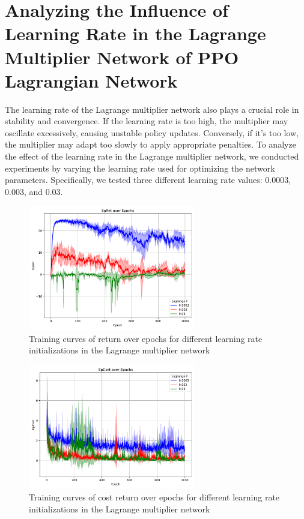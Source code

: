 \section{Analyzing the Influence of Learning Rate in the Lagrange Multiplier Network of PPO Lagrangian Network} \label{chap4:sec:experiments:lagrange_lr}

The learning rate of the Lagrange multiplier network also plays a crucial role in stability and convergence. 
If the learning rate is too high, the multiplier may oscillate excessively, causing unstable policy updates. 
Conversely, if it’s too low, the multiplier may adapt too slowly to apply appropriate penalties.
To analyze the effect of the learning rate in the Lagrange multiplier network, we conducted experiments by varying the learning rate used for optimizing the network parameters.
Specifically, we tested three different learning rate values: 0.0003, 0.003, and 0.03.

\begin{figure}[h]
  \centering
  \includegraphics[width=0.65\textwidth]{imgs/chap4/lagrange_lr/return.pdf}
  \caption{Training curves of return over epochs for different learning rate initializations in the Lagrange multiplier network}
  \label{chap4:fig:lagrange_lr_return}
\end{figure}

\begin{figure}[h]
  \centering
  \includegraphics[width=0.65\textwidth]{imgs/chap4/lagrange_lr/cost.pdf}
  \caption{Training curves of cost return over epochs for different learning rate initializations in the Lagrange multiplier network}
  \label{chap4:fig:lagrange_lr_cost}
\end{figure}

